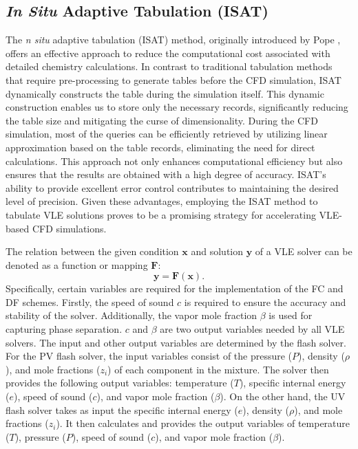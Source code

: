\subsection{\textit{In Situ} Adaptive Tabulation (ISAT)}
\label{sec:ISAT}
The \textit{n situ} adaptive tabulation (ISAT) method, originally introduced by Pope \cite{pope1997computationally}, offers an effective approach to reduce the computational cost associated with detailed chemistry calculations. In contrast to traditional tabulation methods that require pre-processing to generate tables before the CFD simulation, ISAT dynamically constructs the table during the simulation itself. This dynamic construction enables us to store only the necessary records, significantly reducing the table size and mitigating the curse of dimensionality. During the CFD simulation, most of the queries can be efficiently retrieved by utilizing linear approximation based on the table records, eliminating the need for direct calculations. This approach not only enhances computational efficiency but also ensures that the results are obtained with a high degree of accuracy. ISAT's ability to provide excellent error control contributes to maintaining the desired level of precision. Given these advantages, employing the ISAT method to tabulate VLE solutions proves to be a promising strategy for accelerating VLE-based CFD simulations.

The relation between the given condition $\boldsymbol{x}$ and solution $\boldsymbol{y}$ of a VLE solver can be denoted as a function or mapping $\boldsymbol{F}$:
$$\boldsymbol{y=F\left(x\right)}.$$
Specifically, certain variables are required for the implementation of the FC and DF schemes. Firstly, the speed of sound $c$ is required to ensure the accuracy and stability of the solver. Additionally, the vapor mole fraction $\beta$ is used for capturing phase separation. $c$ and $\beta$ are two output variables needed by all VLE solvers. The input and other output variables are determined by the flash solver. For the PV flash solver, the input variables consist of the pressure ($P$), density ($\rho$), and mole fractions ($z_i$) of each component in the mixture. The solver then provides the following output variables: temperature ($T$), specific internal energy ($e$), speed of sound ($c$), and vapor mole fraction ($\beta$).
On the other hand, the UV flash solver takes as input the specific internal energy ($e$), density ($\rho$), and mole fractions ($z_i$). It then calculates and provides the output variables of temperature ($T$), pressure ($P$), speed of sound ($c$), and vapor mole fraction ($\beta$).

